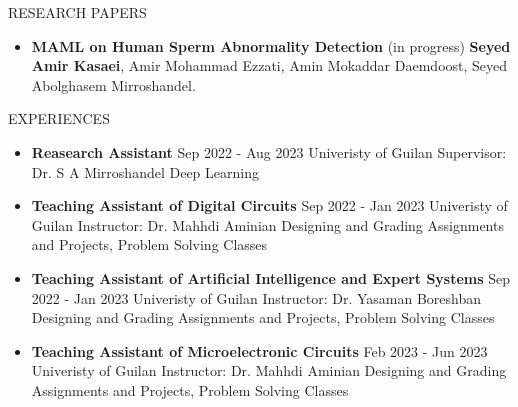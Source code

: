 \documentclass[]{CV}
\begin{document}
\begin{section}{RESEARCH PAPERS}
\begin{itemize}
\item \textbf{MAML on Human Sperm Abnormality Detection} \hfill (in progress)\newline
\textbf{Seyed Amir Kasaei}, Amir Mohammad  Ezzati, Amin Mokaddar Daemdoost, Seyed Abolghasem Mirroshandel.
\end{itemize}
\end{section}


\begin{section}{EXPERIENCES}
\begin{multicols}{2}
\begin{itemize}
\item {\textbf{Reasearch Assistant} \newline Sep 2022 - Aug 2023 \newline Univeristy of Guilan \newline Supervisor: Dr. S A Mirroshandel \newline Deep Learning}
\item {\textbf{Teaching Assistant of Digital Circuits} \newline Sep 2022 - Jan 2023 \newline Univeristy of Guilan  \newline Instructor: Dr. Mahhdi Aminian \newline Designing and Grading Assignments and Projects, Problem Solving Classes}\\

\item {\textbf{Teaching Assistant of Artificial Intelligence and Expert Systems} \newline Sep 2022 - Jan 2023 \newline Univeristy of Guilan \newline Instructor: Dr. Yasaman Boreshban \newline Designing and Grading Assignments and Projects, Problem Solving Classes}

\item {\textbf{Teaching Assistant of Microelectronic Circuits} \newline Feb 2023 - Jun 2023 \newline Univeristy of Guilan \newline Instructor: Dr. Mahhdi Aminian \newline Designing and Grading Assignments and Projects, Problem Solving Classes}
\end{itemize}
\end{multicols}
\end{section}
\end{document}

